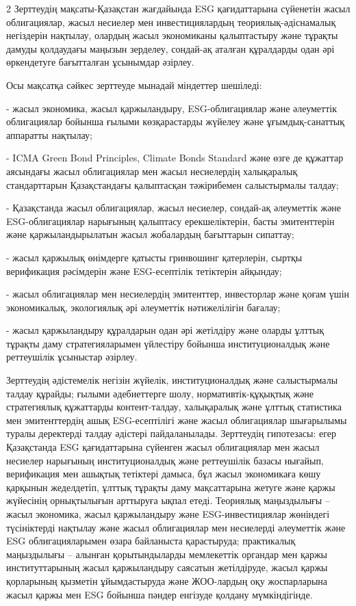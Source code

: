 \begin{multicols}{2}
Зерттеудің мақсаты-Қазақстан жағдайында ESG қағидаттарына сүйенетін
жасыл облигациялар, жасыл несиелер мен инвестициялардың
теориялық-әдіснамалық негіздерін нақтылау, олардың жасыл экономиканы
қалыптастыру және тұрақты дамуды қолдаудағы маңызын зерделеу, сондай-ақ
аталған құралдарды одан әрі өркендетуге бағытталған ұсынымдар әзірлеу.

Осы мақсатқа сәйкес зерттеуде мынадай міндеттер шешіледі:

- жасыл экономика, жасыл қаржыландыру, ESG-облигациялар және әлеуметтік
облигациялар бойынша ғылыми көзқарастарды жүйелеу және ұғымдық-санаттық
аппаратты нақтылау;

- ICMA Green Bond Principles, Climate Bonds Standard және өзге де
құжаттар аясындағы жасыл облигациялар мен жасыл несиелердің халықаралық
стандарттарын Қазақстандағы қалыптасқан тәжірибемен салыстырмалы талдау;

- Қазақстанда жасыл облигациялар, жасыл несиелер, сондай-ақ әлеуметтік
және ESG-облигациялар нарығының қалыптасу ерекшеліктерін, басты
эмитенттерін және қаржыландырылатын жасыл жобалардың бағыттарын
сипаттау;

- жасыл қаржылық өнімдерге қатысты гринвошинг қатерлерін, сыртқы
верификация рәсімдерін және ESG-есептілік тетіктерін айқындау;

- жасыл облигациялар мен несиелердің эмитенттер, инвесторлар және қоғам
үшін экономикалық, экологиялық әрі әлеуметтік нәтижелілігін бағалау;

- жасыл қаржыландыру құралдарын одан әрі жетілдіру және оларды ұлттық
тұрақты даму стратегияларымен үйлестіру бойынша институционалдық және
реттеушілік ұсыныстар әзірлеу.

Зерттеудің әдістемелік негізін жүйелік, институционалдық және
салыстырмалы талдау құрайды; ғылыми әдебиеттерге шолу,
нормативтік-құқықтық және стратегиялық құжаттарды контент-талдау,
халықаралық және ұлттық статистика мен эмитенттердің ашық ESG-есептілігі
және жасыл облигациялар шығарылымы туралы деректерді талдау әдістері
пайдаланылады. Зерттеудің гипотезасы: егер Қазақстанда ESG қағидаттарына
сүйенген жасыл облигациялар мен жасыл несиелер нарығының
институционалдық және реттеушілік базасы нығайып, верификация мен
ашықтық тетіктері дамыса, бұл жасыл экономикаға көшу қарқынын
жеделдетіп, ұлттық тұрақты даму мақсаттарына жетуге және қаржы жүйесінің
орнықтылығын арттыруға ықпал етеді. Теориялық маңыздылығы -- жасыл
экономика, жасыл қаржыландыру және ESG-инвестициялар жөніндегі
түсініктерді нақтылау және жасыл облигациялар мен несиелерді әлеуметтік
және ESG облигацияларымен өзара байланыста қарастыруда; практикалық
маңыздылығы -- алынған қорытындыларды мемлекеттік органдар мен қаржы
институттарының жасыл қаржыландыру саясатын жетілдіруде, жасыл қаржы
қорларының қызметін ұйымдастыруда және ЖОО-лардың оқу жоспарларына жасыл
қаржы мен ESG бойынша пәндер енгізуде қолдану мүмкіндігінде.


\end{multicols}
